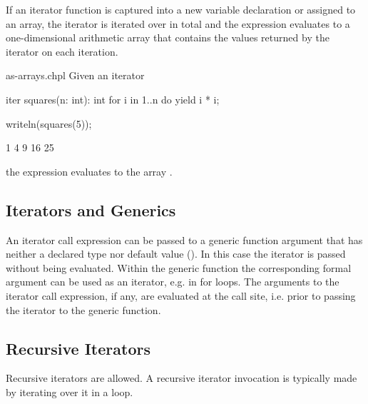If an iterator function is captured into a new variable declaration or
assigned to an array, the iterator is iterated over in total and the
expression evaluates to a one-dimensional arithmetic array that
contains the values returned by the iterator on each iteration.
\begin{chapelexample}{as-arrays.chpl}
Given an iterator
\begin{chapel}
iter squares(n: int): int {
  for i in 1..n do
    yield i * i;
}
\end{chapel}
\begin{chapelpost}
writeln(squares(5));
\end{chapelpost}
\begin{chapelprintoutput}
1 4 9 16 25
\end{chapelprintoutput}
the expression  evaluates to the array .
\end{chapelexample}

\subsection{Iterators and Generics}
\label{Iterators_and_Generics}

An iterator call expression can be passed to a generic function argument that
has neither a declared type nor default value
().
In this case the iterator is passed without being evaluated.
Within the generic function the corresponding formal argument
can be used as an iterator, e.g. in for loops.
The arguments to the iterator call expression, if any, are evaluated
at the call site, i.e. prior to passing the iterator to the generic function.

\subsection{Recursive Iterators}
\label{Recursive_Iterators}

Recursive iterators are allowed. A recursive iterator invocation is
typically made by iterating over it in a loop.



